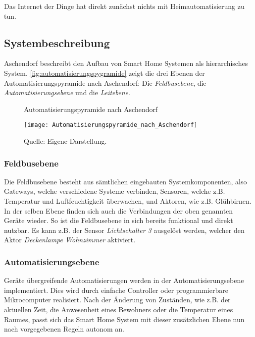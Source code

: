 Das Internet der Dinge hat direkt zunächst nichts mit Heimautomatisierung zu tun.


\subsection{Systembeschreibung}

Aschendorf beschreibt den Aufbau von Smart Home Systemen als hierarchisches System.
\autoref{fig:automatisierungspygramide} zeigt die drei Ebenen der Automatisierungspyramide nach Aschendorf:
Die \textit{Feldbusebene}, die \textit{Automatisierungsebene} und die \textit{Leitebene}. 

\begin{figure}[ht]
	\centering
	\caption{Automatisierungspyramide nach Aschendorf}
	\texttt{[image: Automatisierungspyramide\_nach\_Aschendorf]}
	\caption*{\footnotesize{Quelle: Eigene Darstellung.}}
	\label{fig:automatisierungspygramide}
\end{figure}

\subsubsection{Feldbusebene}

Die Feldbusebene besteht aus sämtlichen eingebauten Systemkomponenten, also Gateways, welche verschiedene Systeme verbinden, Sensoren, welche z.B. Temperatur und Luftfeuchtigkeit überwachen, und Aktoren, wie z.B. Glühbirnen.
In der selben Ebene finden sich auch die Verbindungen der oben genannten Geräte wieder.
So ist die Feldbusebene in sich bereits funktional und direkt nutzbar.
Es kann z.B. der Sensor \textit{Lichtschalter 3} ausgelöst werden, welcher den Aktor \textit{Deckenlampe Wohnzimmer} aktiviert.

\subsubsection{Automatisierungsebene}

Geräte übergreifende Automatisierungen werden in der Automatisierungsebene implementiert.
Dies wird durch einfache Controller oder programmierbare Mikrocomputer realisiert.
Nach der Änderung von Zuständen, wie z.B. der aktuellen Zeit, die Anwesenheit eines Bewohners oder die Temperatur eines Raumes, passt sich das Smart Home System mit dieser zusätzlichen Ebene nun nach vorgegebenen Regeln autonom an.

